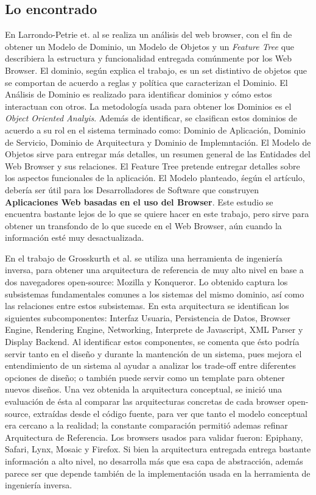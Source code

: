 \subsection{Lo encontrado}
En Larrondo-Petrie et. al \cite{535061} se realiza un análisis del web browser, con el fin de obtener un Modelo de Dominio, un Modelo de Objetos y un \textit{Feature Tree} que describiera la estructura y funcionalidad entregada comúnmente por los Web Browser. El dominio, según explica el trabajo, es un set distintivo de objetos que se comportan de acuerdo a reglas y política que caracterizan el Dominio. El Análisis de Dominio es realizado para identificar dominios y cómo estos interactuan con otros. La metodología usada para obtener los Dominios es el \textit{Object Oriented Analyis}. Además de identificar, se clasifican estos dominios de acuerdo a su rol en el sistema terminado como: Dominio de Aplicación, Dominio de Servicio, Dominio de Arquitectura y Dominio de Implemntación. El Modelo de Objetos sirve para entregar más detalles, un resumen general de las Entidades del Web Browser y sus relaciones. El Feature Tree pretende entregar detalles sobre los aspectos funcionales de la aplicación. El Modelo planteado, śegún el artículo, debería ser útil para los Desarrolladores de Software que construyen \textbf{Aplicaciones Web basadas en el uso del Browser}.  Este estudio se encuentra bastante lejos de lo que se quiere hacer en este trabajo, pero sirve para obtener un transfondo de lo que sucede en el Web Browser, aún cuando la información esté muy desactualizada.


En el trabajo de Grosskurth et al. \cite{2005-grosskurth-browser-refarch, preprint-grosskurth-browser-archevol} se utiliza una herramienta de ingeniería inversa, para obtener una arquitectura de referencia de muy alto nivel en base a dos navegadores open-source: Mozilla y Konqueror. Lo obtenido captura los subsistemas fundamentales comunes a los sistemas del mismo dominio, así como las relaciones entre estos subsistemas. En esta arquitectura se identifican los siguientes subcomponentes: Interfaz Usuaria, Persistencia de Datos, Browser Engine, Rendering Engine, Networking, Interprete de Javascript, XML Parser y Display Backend. Al identificar estos componentes, se comenta que ésto podría servir tanto en el diseño y durante la mantención de un sistema, pues mejora el entendimiento de un sistema al ayudar a analizar los trade-off entre diferentes opciones de diseño; o también puede servir como un template para obtener nuevos diseños. Una vez obtenida la arquitectura conceptual, se inició una evaluación de ésta al comparar las arquitecturas concretas de cada browser open-source, extraídas desde el código fuente, para ver que tanto el modelo conceptual era cercano a la realidad; la constante comparación permitió ademas refinar Arquitectura de Referencia. Los browsers usados para validar fueron: Epiphany, Safari, Lynx, Mosaic y Firefox. Si bien la arquitectura entregada entrega bastante información a alto nivel, no desarrolla más que esa capa de abstracción, además parece ser que depende también de la implementación usada en la herramienta de ingeniería inversa. 


